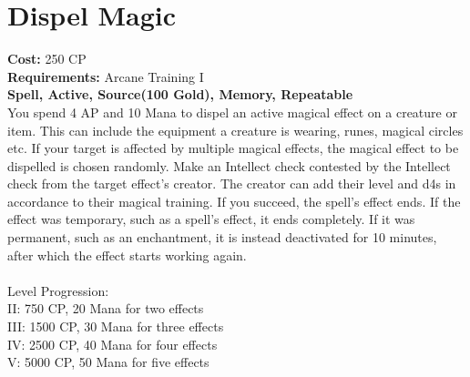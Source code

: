 \section{Dispel Magic}
\textbf{Cost:} 250 CP\\
\textbf{Requirements:} Arcane Training I\\
\textbf{Spell, Active, Source(100 Gold), Memory, Repeatable}\\
You spend 4 AP and 10 Mana to dispel an active magical effect on a creature or item. This can include the equipment a creature is wearing, runes, magical circles etc. If your target is affected by multiple magical effects, the magical effect to be dispelled is chosen randomly. Make an Intellect check contested by the Intellect check from the target effect's creator. The creator can add their level and d4s in accordance to their magical training. If you succeed, the spell's effect ends. If the effect was temporary, such as a spell's effect, it ends completely. If it was permanent, such as an enchantment, it is instead deactivated for 10 minutes, after which the effect starts working again.\\
\\
Level Progression:\\
II: 750 CP, 20 Mana for two effects\\
III: 1500 CP, 30 Mana for three effects\\
IV: 2500 CP, 40 Mana for four effects\\
V: 5000 CP, 50 Mana for five effects\\